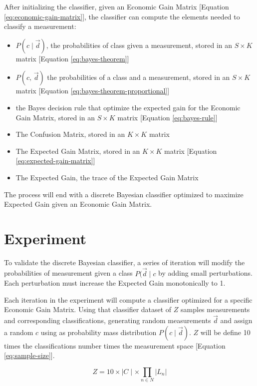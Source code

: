 \documentclass[letterpaper, conference]{IEEEtran}
\begin{document}
After initializing the classifier, given an Economic Gain Matrix [Equation \ref{eq:economic-gain-matrix}], the classifier can compute the elements needed to classify a measurement:

\begin{itemize}
  \item $P(c \mid \vec{d})$, the probabilities of class given a measurement, stored in an $S \times K$ matrix [Equation \ref{eq:bayes-theorem}]
  \item $P(c,\, \vec{d})$ the probabilities of a class and a measurement, stored in an $S \times K$ matrix [Equation \ref{eq:bayes-theorem-proportional}]
  \item the Bayes decision rule that optimize the expected gain for the Economic Gain Matrix, stored in an $S \times K$ matrix [Equation \ref{eq:bayes-rule}]
  \item The Confusion Matrix, stored in an $K \times K$ matrix
  \item The Expected Gain Matrix, stored in an $K \times K$ matrix [Equation \ref{eq:expected-gain-matrix}]
  \item The Expected Gain, the trace of the Expected Gain Matrix
\end{itemize}

The process will end with a discrete Bayesian classifier optimized to maximize Expected Gain given an Economic Gain Matrix.

\section{Experiment}\label{experiment}

To validate the discrete Bayesian classifier, a series of iteration will modify the probabilities of measurement given a class $P(\vec{d} \mid c$ by adding small perturbations. Each perturbation must increase the Expected Gain monotonically to 1.

Each iteration in the experiment will compute a classifier optimized for a specific Economic Gain Matrix. Using that classifier dataset of $Z$ samples measurements and corresponding classifications, generating random measurements $\vec{d}$ and assign a random $c$ using as probability mass distribution $P(c \mid \vec{d})$. $Z$ will be define 10 times the classifications number times the measurement space [Equation \ref{eq:sample-size}].

\begin{equation}\label{eq:sample-size}
  Z = 10 \times \mid C \mid \times \prod_{n \in N} |L_n|
\end{equation}
\end{document}
